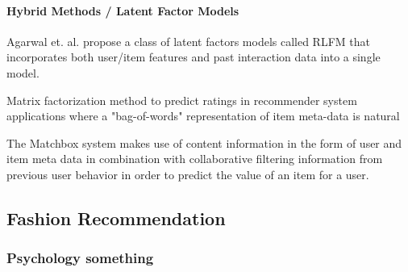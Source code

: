

\paragraph{Hybrid Methods / Latent Factor Models}



Agarwal et. al. \cite{Agarwal2009} propose a class of latent factors models called RLFM that incorporates both user/item features and past interaction data into a single model.



Matrix factorization method to predict ratings in recommender system applications where a "bag-of-words" representation of item meta-data is natural

The Matchbox system makes use of content information in the form of user and item meta data in combination with collaborative filtering information from previous user behavior in order to predict the value of an item for a user.


\subsection{Fashion Recommendation}

\subsubsection{Psychology something}

